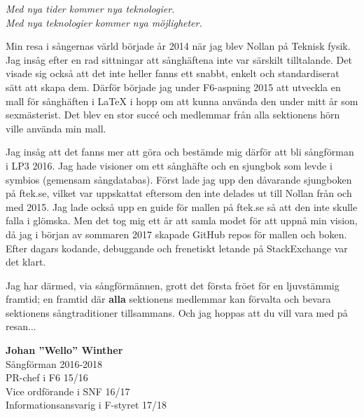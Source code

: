 {\large
\setlength{\parskip}{0.8em}
\textit{Med nya tider kommer nya teknologier.}\\
\textit{Med nya teknologier kommer nya möjligheter.}

Min resa i sångernas värld började år 2014 när jag blev Nollan på Teknisk fysik. Jag insåg efter en rad sittningar att sånghäftena inte var särskilt tilltalande. Det visade sig också att det inte heller fanns ett snabbt, enkelt och standardiserat sätt att skapa dem.
Därför började jag under F6-aspning 2015 att utveckla en mall för sånghäften i LaTeX i hopp om att kunna använda den under mitt år som sexmästerist.
Det blev en stor succé och medlemmar från alla sektionens hörn ville använda min mall.

Jag insåg att det fanns mer att göra och bestämde mig därför att bli sångförman i LP3 2016.
Jag hade visioner om ett sånghäfte och en sjungbok som levde i symbios (gemensam sångdatabas).
Först lade jag upp den dåvarande sjungboken på ftek.se, vilket var uppskattat eftersom den inte delades ut till Nollan från och med 2015.
Jag lade också upp en guide för mallen på ftek.se så att den inte skulle falla i glömska.
Men det tog mig ett år att samla modet för att uppnå min vision, då jag i början av sommaren 2017 skapade GitHub repos för mallen och boken.
Efter dagars kodande, debuggande och frenetiskt letande på StackExchange var det klart.

Jag har därmed, via sångförmännen, grott det första fröet för en ljuvstämmig framtid; en framtid där \textbf{alla} sektionens medlemmar kan förvalta och bevara sektionens sångtraditioner tillsammans. Och jag hoppas att du vill vara med på resan...

\begin{flushright}
\textbf{Johan ''Wello'' Winther}\\
Sångförman 2016-2018\\
PR-chef i F6 15/16\\
Vice ordförande i SNF 16/17\\
Informationsansvarig i F-styret 17/18\\
\end{flushright}
}

